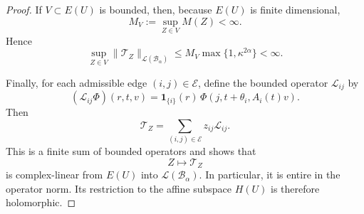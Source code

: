 \documentclass[10pt,a4paper]{amsart}
\begin{document}
\begin{proof}
If \(V\subset E(U)\) is bounded, then, because \(E(U)\) is finite
dimensional,
\[
 M_V:=\sup_{Z\in V}M(Z)<\infty.
\]
Hence
\[
 \sup_{Z\in V}
 \|\mathcal T_Z\|_{\mathcal L(\mathcal B_\alpha)}
 \leq
 M_V\max\{1,\kappa^{2\alpha}\}<\infty.
\]

Finally, for each admissible edge \((i,j)\in\mathcal E\), define the
bounded operator \(\mathcal L_{ij}\) by
\[
 (\mathcal L_{ij}\Phi)(r,t, v)
 =
 \mathbf 1_{\{i\}}(r)\,
 \Phi\left(
 j,t+\theta_i,A_i(t)v \right).
\]
Then
\begin{equation}\label{eq:operator-linear-decomposition}
 \mathcal T_Z
 =
 \sum_{(i,j)\in\mathcal E}z_{ij}\mathcal L_{ij}.
\end{equation}
This is a finite sum of bounded operators and shows that
\[
 Z\longmapsto\mathcal T_Z
\]
is complex-linear from \(E(U)\) into
\(\mathcal L(\mathcal B_\alpha)\).  In particular, it is entire in
the operator norm.  Its restriction to the affine subspace \(H(U)\)
is therefore holomorphic.
\end{proof}
\end{document}
